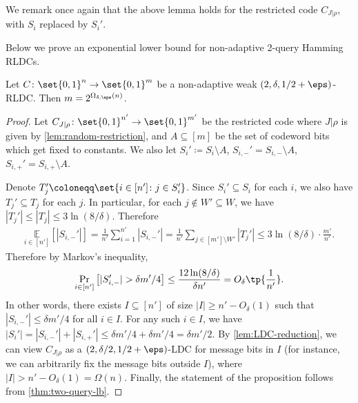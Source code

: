 We remark once again that the above lemma holds for the restricted code $C_{J|\rho}$, with $S_i$ replaced by $S_i'$.

Below we prove an exponential lower bound for non-adaptive 2-query Hamming RLDCs.
\begin{proposition} \label{prop:non-adaptive-2qRLDC}
	Let $C \colon \set{0,1}^n \rightarrow \set{0,1}^m$ be a non-adaptive weak $(2,\delta,1/2+\eps)$-RLDC. Then $m = 2^{\Omega_{\delta,\eps}(n)}$.
\end{proposition}
\begin{proof}
    Let $C_{J|\rho}\colon \set{0,1}^{n'}\rightarrow \set{0,1}^{m'}$ be the restricted code where $J|\rho$ is given by \cref{lem:random-restriction}, and $A \subseteq [m]$ be the set of codeword bits which get fixed to constants. We also let $S_i'\coloneqq S_i\setminus A$, $S_{i,-}'=S_{i,-}\setminus A$, $S_{i,+}'=S_{i,+}\setminus A$.
    
	Denote $T_j'\coloneqq \set{i \in [n'] \colon j \in S_i'}$. Since $S_i'\subseteq S_i$ for each $i$, we also have $T_j'\subseteq T_j$ for each $j$. In particular, for each $j \notin W' \subseteq W$, we have $|T_j'| \le |T_j| \le 3\ln(8/\delta)$. Therefore
	\begin{align*}
	\underset{i \in [n']}{\mathbb{E}}\left[|S_{i,-}'|\right] = \frac{1}{n'}\sum_{i=1}^{n'}|S_{i,-}'| = \frac{1}{n'}\sum_{j \in [m']\setminus W'}|T_j'| \le 3\ln(8/\delta)\cdot \frac{m'}{n'}.
	\end{align*}
	Therefore by Markov's inequality, 
	\begin{align*}
	\underset{i \in [n']}{\Pr}\left[|S_{i,-}'| > \delta m'/4 \right] \le \frac{12\ln(8/\delta)}{\delta n'} = O_{\delta}\tp{\frac{1}{n'}}.
	\end{align*}
	In other words, there exists $I \subseteq [n']$ of size $|I| \ge n'-O_{\delta}(1)$ such that $|S_{i,-}'| \le \delta m'/4$ for all $i \in I$. For any such $i \in I$, we have $|S_i'| = |S_{i,-}'| + |S_{i,+}'| \le \delta m'/4 + \delta m'/4 = \delta m'/2$. By \cref{lem:LDC-reduction}, we can view $C_{J|\rho}$ as a $(2,\delta/2,1/2+\eps)$-LDC for message bits in $I$ (for instance, we can arbitrarily fix the message bits outside $I$), where $|I| > n'-O_{\delta}(1) = \Omega(n)$. Finally, the statement of the proposition follows from \cref{thm:two-query-lb}. %
\end{proof}

